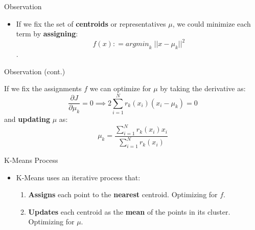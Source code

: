\documentclass[serif, aspectratio=169]{beamer}
\begin{document}
\begin{frame}{Observation}
    \begin{itemize}

\item If we fix the set of \textbf{centroids} or representatives $\mu$, we could minimize each term by \textbf{assigning}:
  $$ f(x) : = \textit{argmin}_k \; ||x - \mu_k||^2 $$.
  
    \end{itemize}
\end{frame}

\begin{frame}{Observation (cont.)}
    
     If we fix the assignments $f$ we can optimize for $\mu$ by taking the derivative as:
    $$
        \frac{\partial J}{\partial \mu_k } = 0 \implies 2 \sum_{i=1}^{N} r_k(x_i) \left(x_i - \mu_k \right) = 0
    $$
and \textbf{updating} $\mu$ as:
    $$
        \mu_k = \frac{\sum_{i=1}^{N}{r_k(x_i)x_i}}{\sum_{i=1}^{N} r_k(x_i)}
    $$

\end{frame}

\begin{frame}{K-Means Process}
\begin{itemize}
\item K-Means uses an iterative process that:
\begin{enumerate}
    \item \textbf{Assigns} each point to the \textbf{nearest} centroid. Optimizing for $f$.
    \item \textbf{Updates} each centroid as the \textbf{mean} of the points in its cluster. Optimizing for $\mu$.
\end{enumerate}


    \end{itemize}
\end{frame}
\end{document}
